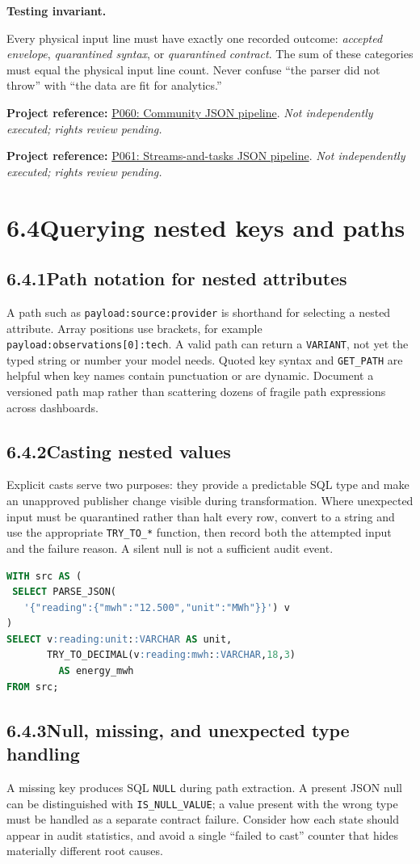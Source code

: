 \documentclass[11pt,twoside]{article}
\newcommand{\topic}[2]{\subsection*{#1\quad #2}}
\newcommand{\repo}[2]{\par\begingroup\fontsize{8.0}{9.6}\selectfont\sffamily\color{inkgray}\textbf{Project reference:} \href{#2}{#1}. \textit{Not independently executed; rights review pending.}\par\endgroup}
\begin{document}
\begin{insight}\textbf{Testing invariant.}\par
Every physical input line must have exactly one recorded outcome: \emph{accepted envelope}, \emph{quarantined syntax}, or \emph{quarantined contract}. The sum of these categories must equal the physical input line count. Never confuse ``the parser did not throw'' with ``the data are fit for analytics.''\end{insight}
\repo{P060: Community JSON pipeline}{https://github.com/kromozome2003/Snowflake-Json-DataPipeline}
\repo{P061: Streams-and-tasks JSON pipeline}{https://github.com/atharvadevne123/Automated-json-pipeline-snowflake-streams-tasks}
\newpage
\section*{6.4\quad Querying nested keys and paths}
\topic{6.4.1}{Path notation for nested attributes}
A path such as \texttt{payload:source:provider} is shorthand for selecting a nested attribute. Array positions use brackets, for example \texttt{payload:observations[0]:tech}. A valid path can return a \texttt{VARIANT}, not yet the typed string or number your model needs. Quoted key syntax and \texttt{GET\_PATH} are helpful when key names contain punctuation or are dynamic. Document a versioned path map rather than scattering dozens of fragile path expressions across dashboards.

\topic{6.4.2}{Casting nested values}
Explicit casts serve two purposes: they provide a predictable SQL type and make an unapproved publisher change visible during transformation. Where unexpected input must be quarantined rather than halt every row, convert to a string and use the appropriate \texttt{TRY\_TO\_*} function, then record both the attempted input and the failure reason. A silent null is not a sufficient audit event.

\begin{lstlisting}[language=SQL,caption={Access a nested energy value and convert deliberately.}]
WITH src AS (
 SELECT PARSE_JSON(
   '{"reading":{"mwh":"12.500","unit":"MWh"}}') v
)
SELECT v:reading:unit::VARCHAR AS unit,
       TRY_TO_DECIMAL(v:reading:mwh::VARCHAR,18,3)
         AS energy_mwh
FROM src;
\end{lstlisting}
\topic{6.4.3}{Null, missing, and unexpected type handling}
A missing key produces SQL \texttt{NULL} during path extraction. A present JSON null can be distinguished with \texttt{IS\_NULL\_VALUE}; a value present with the wrong type must be handled as a separate contract failure. Consider how each state should appear in audit statistics, and avoid a single ``failed to cast'' counter that hides materially different root causes.
\end{document}

